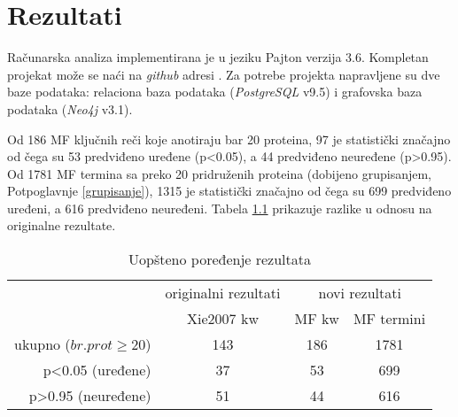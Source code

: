 
\chapter{Rezultati} %

\label{Rezultati} %

Računarska analiza implementirana je u jeziku Pajton  verzija 3.6.
Kompletan projekat može se naći na \textit{github} adresi \cite{projekat}. Za
potrebe projekta napravljene su dve baze podataka: relaciona baza podataka
(\textit{PostgreSQL} v9.5) i grafovska baza podataka (\textit{Neo4j} v3.1).

Od 186 MF ključnih reči koje anotiraju bar 20 proteina, 97 je statistički
značajno od čega su 53 predviđeno uređene (p<0.05), a 44 predviđeno neuređene
(p>0.95).  Od 1781 MF termina sa preko 20 pridruženih proteina (dobijeno
grupisanjem, Potpoglavnje \ref{grupisanje}), 1315 je statistički značajno od
čega su 699 predviđeno uređeni, a 616 predviđeno neuređeni.  Tabela
\ref{tab:kw_uopsteno} prikazuje razlike u odnosu na originalne rezultate.

\begin{table}[htpb]
\begin{tabular}{|r|c|c|c|}
  \hline
                     & \small originalni rezultati  & \multicolumn{2}{c|}{ novi rezultati} \\
                     & Xie2007 kw & MF kw  & MF termini                  \\
  \hline
  ukupno ($br. prot\ge20$)     & 143        & 186    & 1781                        \\
  p<0.05 (uređene)   & 37         & 53     & 699                         \\
  p>0.95 (neuređene) & 51         & 44     & 616                         \\
  \hline
\end{tabular}
  \centering
  \caption{Uopšteno poređenje rezultata}
  \label{tab:kw_uopsteno}
\end{table}

